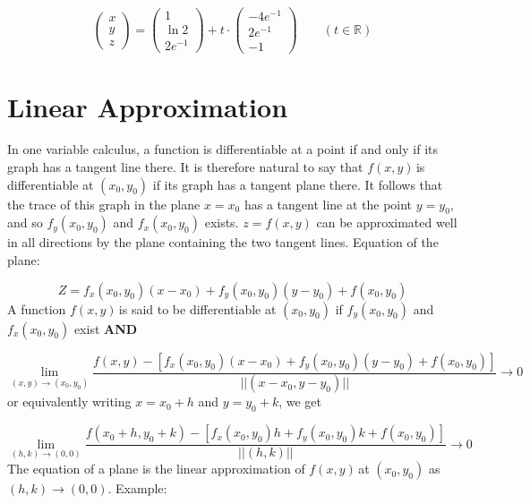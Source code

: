 \documentclass{article}
\newcommand{\n}{\leavevmode \newline} %
\newcommand{\nn}{\leavevmode \newline \newline} %
\newcommand{\R}{\mathbb{R}} %
\newcommand{\limxyto}[2]{\lim_{(x,y)\to(#1,#2)}} %
\newcommand{\fxy}{$f(x,y)\,$} %
\numberwithin{equation}{subsection} %
\begin{document}
\begin{equation}
    \begin{pmatrix}
    x\\y\\z
    \end{pmatrix}
    =
    \begin{pmatrix}
    1\\\ln2\\2e^{-1}
    \end{pmatrix}
    + t\cdot
    \begin{pmatrix}
    -4e^{-1} \\ 2e^{-1} \\ -1
    \end{pmatrix}
    \qquad (t\in\R)
\end{equation}

\section{Linear Approximation}
In one variable calculus, a function is differentiable at a point if and only if its graph has a tangent line there. It is therefore natural to say that \fxy is differentiable at $(x_0,y_0)$ if its graph has a tangent plane there. It follows that the trace of this graph in the plane $x=x_0$ has a tangent line at the point $y=y_0$, and so $f_y(x_0,y_0)$ and $f_x(x_0,y_0)$ exists. $z=f(x,y)$ can be approximated well in all directions by the plane containing the two tangent lines.
\nn
Equation of the plane:

\begin{equation}
    Z=f_x(x_0,y_0)(x-x_0)+f_y(x_0,y_0)(y-y_0)+f(x_0,y_0)
\end{equation}
\n
A function \fxy is said to be differentiable at $(x_0,y_0)$ if $f_y(x_0,y_0)$ and $f_x(x_0,y_0)$ exist \textbf{AND}

\begin{equation}
    \limxyto{x_0}{y_0}\frac{f(x,y)-\left[f_x(x_0,y_0)(x-x_0)+f_y(x_0,y_0)(y-y_0)+f(x_0,y_0)\right]}{||(x-x_0,y-y_0)||} \to 0
\end{equation}
\n
or equivalently writing $x=x_0+h$ and $y=y_0+k$, we get

\begin{equation}
    \lim_{(h,k)\to(0,0)}\frac{f(x_0+h,y_0+k)-\left[f_x(x_0,y_0)h+f_y(x_0,y_0)k+f(x_0,y_0)\right]}{||(h,k)||} \to 0
\end{equation}
\n
The equation of a plane is the linear approximation of \fxy at $(x_0,y_0)$ as $(h,k)\to(0,0)$.
\nn
Example:
\end{document}
